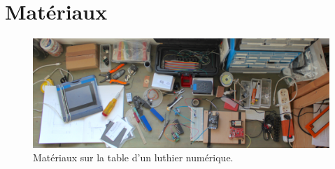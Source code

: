 
\section{Matériaux}
\label{sec:interfaces:materials}

\begin{figure}[!htbp]
	\captionsetup{format=plain}%
	\includegraphics[width=\textwidth]{gfx/05_interfaces/lutherie-worktable.jpg}
	\caption[Matériaux sur la table d'un luthier numérique]{Matériaux sur la table d'un luthier numérique.}
	\label{fig:interface:table-luthier}
\end{figure}

